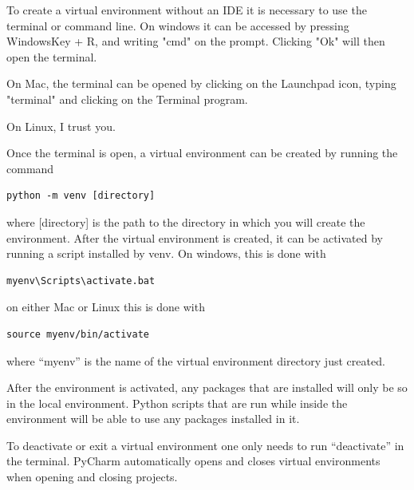 \documentclass[a4paper,12pt]{article}
\begin{document}
To create a virtual environment without an IDE it is necessary to use the terminal or command line. On windows it can be accessed by pressing WindowsKey + R, and writing "cmd" on the prompt. Clicking "Ok" will then open the terminal.

On Mac, the terminal can be opened by clicking on the Launchpad icon, typing "terminal" and clicking on the Terminal program.

On Linux, I trust you.

Once the terminal is open, a virtual environment can be created by running the command
\begin{tcolorbox}[
    enhanced,
    attach boxed title to top left={xshift=6mm,yshift=-3mm},
    colback=lightgreen!20,
    colframe=lightgreen,
    colbacktitle=lightgreen,
    sharp corners,
    ]
    \begin{verbatim}
python -m venv [directory]
    \end{verbatim}
\end{tcolorbox}
\noindent where [directory] is the path to the directory in which you will create the environment. After the virtual environment is created, it can be activated by running a script installed by venv. On windows, this is done with
\begin{tcolorbox}[
    enhanced,
    attach boxed title to top left={xshift=6mm,yshift=-3mm},
    colback=lightgreen!20,
    colframe=lightgreen,
    colbacktitle=lightgreen,
    sharp corners,
    ]
    \begin{verbatim}
myenv\Scripts\activate.bat
    \end{verbatim}
\end{tcolorbox}
\noindent on either Mac or Linux this is done with
\begin{tcolorbox}[
    enhanced,
    attach boxed title to top left={xshift=6mm,yshift=-3mm},
    colback=lightgreen!20,
    colframe=lightgreen,
    colbacktitle=lightgreen,
    sharp corners,
    ]
    \begin{verbatim}
source myenv/bin/activate
    \end{verbatim}
\end{tcolorbox}
\noindent where ``myenv'' is the name of the virtual environment directory just created.

After the environment is activated, any packages that are installed will only be so in the local environment. Python scripts that are run while inside the environment will be able to use any packages installed in it.

To deactivate or exit a virtual environment one only needs to run ``deactivate'' in the terminal. PyCharm automatically opens and closes virtual environments when opening and closing projects.
\end{document}
